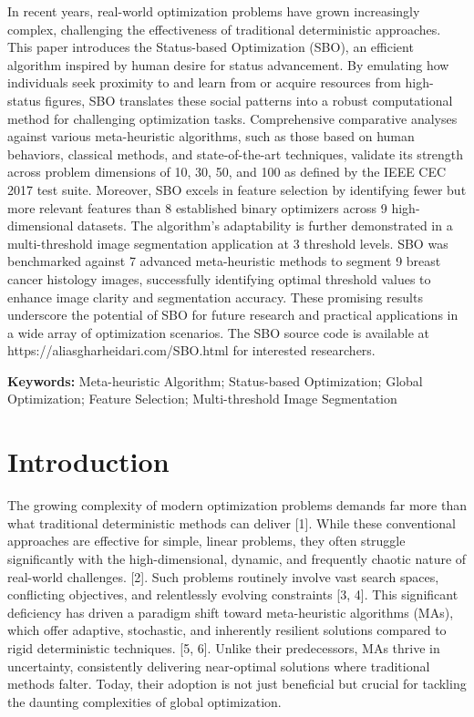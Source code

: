 \documentclass{article} %
\begin{document}
In recent years, real-world optimization problems have grown increasingly complex, challenging the effectiveness of traditional deterministic approaches. This paper introduces the Status-based Optimization (SBO), an efficient algorithm inspired by human desire for status advancement. By emulating how individuals seek proximity to and learn from or acquire resources from high-status figures, SBO translates these social patterns into a robust computational method for challenging optimization tasks. Comprehensive comparative analyses against various meta-heuristic algorithms, such as those based on human behaviors, classical methods, and state-of-the-art techniques, validate its strength across problem dimensions of 10, 30, 50, and 100 as defined by the IEEE CEC 2017 test suite. Moreover, SBO excels in feature selection by identifying fewer but more relevant features than 8 established binary optimizers across 9 high-dimensional datasets. The algorithm's adaptability is further demonstrated in a multi-threshold image segmentation application at 3 threshold levels. SBO was benchmarked against 7 advanced meta-heuristic methods to segment 9 breast cancer histology images, successfully identifying optimal threshold values to enhance image clarity and segmentation accuracy. These promising results underscore the potential of SBO for future research and practical applications in a wide array of optimization scenarios. The SBO source code is available at https://aliasgharheidari.com/SBO.html for interested researchers.



\noindent \textbf{Keywords: }Meta-heuristic Algorithm; Status-based Optimization; Global Optimization; Feature Selection; Multi-threshold Image Segmentation\textbf{}


\section{  Introduction}

The growing complexity of modern optimization problems demands far more than what traditional deterministic methods can deliver [1]. While these conventional approaches are effective for simple, linear problems, they often struggle significantly with the high-dimensional, dynamic, and frequently chaotic nature of real-world challenges. [2]. Such problems routinely involve vast search spaces, conflicting objectives, and relentlessly evolving constraints [3, 4]. This significant deficiency has driven a paradigm shift toward meta-heuristic algorithms (MAs), which offer adaptive, stochastic, and inherently resilient solutions compared to rigid deterministic techniques. [5, 6]. Unlike their predecessors, MAs thrive in uncertainty, consistently delivering near-optimal solutions where traditional methods falter. Today, their adoption is not just beneficial but crucial for tackling the daunting complexities of global optimization. 
\end{document}
